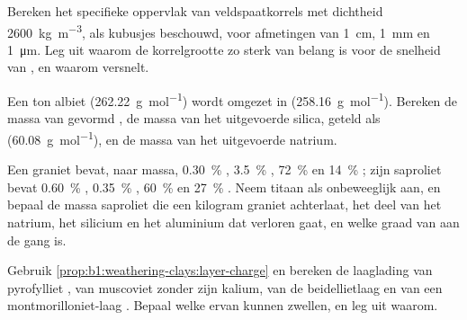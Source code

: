 \begin{exercise}[$\star\star$]\label{exo:b1:weathering-clays:5}
Bereken het specifieke oppervlak van veldspaatkorrels met dichtheid \qty{2600}{kg.m^{-3}}, als kubusjes beschouwd, voor afmetingen van \qty{1}{cm}, \qty{1}{mm} en \qty{1}{\micro m}. Leg uit waarom de korrelgrootte zo sterk van belang is voor de snelheid van , en waarom   versnelt.
\end{exercise}

\begin{exercise}[$\star\star$]\label{exo:b1:weathering-clays:6}
Een ton albiet  (\qty{262.22}{g.mol^{-1}}) wordt omgezet in  (\qty{258.16}{g.mol^{-1}}). Bereken de massa van gevormd , de massa van het uitgevoerde silica, geteld als  (\qty{60.08}{g.mol^{-1}}), en de massa van het uitgevoerde natrium.
\end{exercise}

\begin{exercise}[$\star\star$]\label{exo:b1:weathering-clays:7}
Een graniet bevat, naar massa, \qty{0.30}{\percent} , \qty{3.5}{\percent} , \qty{72}{\percent}  en \qty{14}{\percent} ; zijn saproliet bevat \qty{0.60}{\percent} , \qty{0.35}{\percent} , \qty{60}{\percent}  en \qty{27}{\percent} . Neem titaan als onbeweeglijk aan, en bepaal de massa saproliet die een kilogram graniet achterlaat, het deel van het natrium, het silicium en het aluminium dat verloren gaat, en welke graad van  aan de gang is.
\end{exercise}

\begin{exercise}[$\star\star$]\label{exo:b1:weathering-clays:8}
Gebruik \cref{prop:b1:weathering-clays:layer-charge} en bereken de laaglading van pyrofylliet , van muscoviet  zonder zijn kalium, van de beidellietlaag  en van een montmorilloniet-laag . Bepaal welke ervan kunnen zwellen, en leg uit waarom.
\end{exercise}


